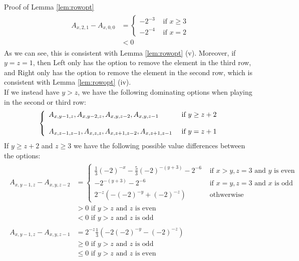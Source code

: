 \begin{proof2}{Proof of Lemma \ref{lem:rowopt}}
\begin{align*}
\begin{split}
A_{x,2,1}-A_{x,0,0}&=\left\{
\begin{array}{ll}
-2^{-3}&\text{ if $x\ge3$}\\
-2^{-4}&\text{ if $x=2$}
\end{array}\right.\\
&<0
\end{split}
\end{align*}
As we can see, this is consistent with Lemma \ref{lem:rowopt} (v). Moreover, if $y=z=1$, then Left only has the option to remove the element in the third row, and Right only has the option to remove the element in the second row, which is consistent with Lemma \ref{lem:rowopt} (iv).
\\
If we instead have $y>z$, we have the following dominating options when playing in the second or third row:
\begin{align*}
\left\{
\begin{array}{l l}
 A_{x,y-1,z},A_{x,y-2,z},A_{x,y,z-2},A_{x,y,z-1}& \text{ if $y\ge z+2$}\\
 ~&~\\
 A_{x,z-1,z-1},A_{x,z,z},A_{x,z+1,z-2},A_{x,z+1,z-1}& \text{ if $y=z+1$}
\end{array}\right.
\end{align*}
If $y\ge z+2$ and $z\ge3$ we have the following possible value differences between the options:
\begin{align*}
\begin{split}
A_{x,y-1,z}-A_{x,y,z-2}&=\left\{
\begin{array}{ll}
\frac{1}{3}(-2)^{-x}-\frac{5}{3}(-2)^{-(y+3)}-2^{-6}&\text{ if $x>y,z=3$ and $y$ is even}\\
-2^{-(y+3)}-2^{-6}&\text{ if $x=y,z=3$ and $x$ is odd}\\
2^{-z}\left(-(-2)^{-y}+(-2)^{-z}\right)&\text{ othwerwise}
\end{array}\right.\\
&>0\text{ if $y>z$ and $z$ is even}\\
&<0\text{ if $y>z$ and $z$ is odd}
\end{split}\\
\begin{split}
A_{x,y-1,z}-A_{x,y,z-1}&=2^{-z}\frac{1}{3}\left(-2(-2)^{-y}-(-2)^{-z}\right)\\
&\ge0\text{ if $y>z$ and $z$ is odd}\\
&\le0\text{ if $y>z$ and $z$ is even}
\end{split}\\

\end{align*}
\end{proof2}
